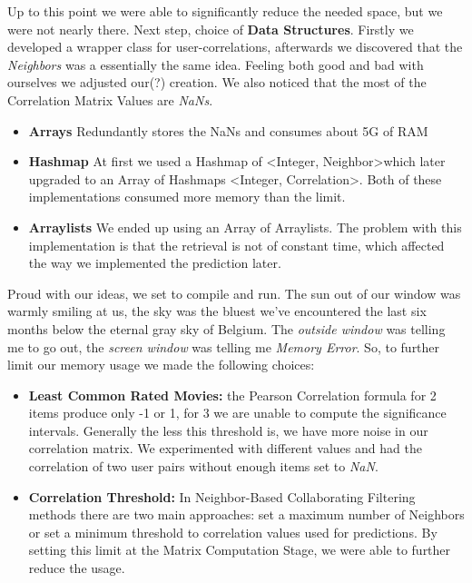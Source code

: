 \documentclass[12pt]{article}
\begin{document}
Up to this point we were able to significantly reduce the needed space, but we were not nearly there. Next step, choice of \textbf{Data Structures}. Firstly we developed a wrapper class for user-correlations, afterwards we discovered that the \textit{Neighbors} was a essentially the same idea. Feeling both good and bad with ourselves we adjusted our(?) creation. We also noticed that the most of the Correlation Matrix Values are \textit{NaNs}. 

\begin{itemize}
  \item \textbf{Arrays} Redundantly stores the NaNs and consumes about 5G of RAM
  \item \textbf{Hashmap} At first we used a Hashmap of <Integer, Neighbor>which later upgraded to an Array of Hashmaps <Integer, Correlation>. Both of these implementations consumed more memory than the limit.
  \item \textbf{Arraylists} We ended up using an Array of Arraylists. The problem with this implementation is that the retrieval is not of constant time, which affected the way we implemented the prediction later. 
\end{itemize}

Proud with our ideas, we set to compile and run. The sun out of our window was warmly smiling at us, the sky was the bluest we've encountered the last six months below the eternal gray sky of Belgium. The \textit{outside window} was telling me to go out, the \textit{screen window} was telling me \textit{Memory Error}. So, to further limit our memory usage we made the following choices:

\begin{itemize}
  \item \textbf{Least Common Rated Movies:} the Pearson Correlation formula for 2 items produce only -1 or 1, for 3 we are unable to compute the significance intervals. Generally the less this threshold is, we have more noise in our correlation matrix. We experimented with different values and had the correlation of two user pairs without enough items set to \textit{NaN}.
  \item \textbf{Correlation Threshold:} In Neighbor-Based Collaborating Filtering methods there are two main approaches: set a maximum number of Neighbors or set a minimum threshold to correlation values used for predictions. By setting this limit at the Matrix Computation Stage, we were able to further reduce the usage.

\end{itemize}
\end{document}
